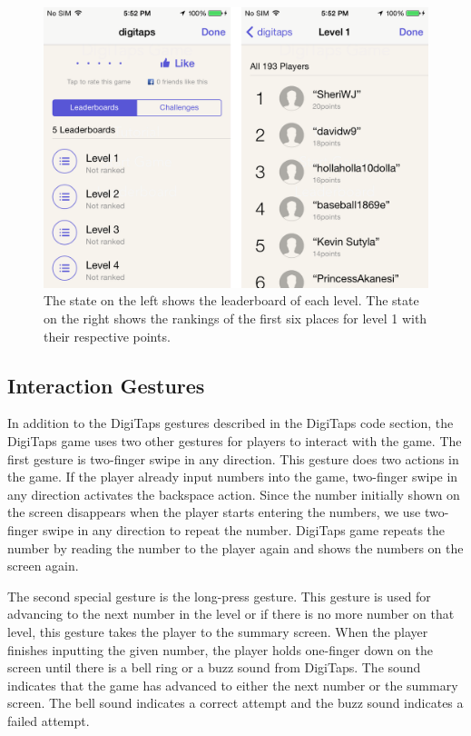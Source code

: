 \begin{figure}[h!]
  \centering
  \includegraphics[width=1.0\textwidth]{figures/leaderboard.png}
  \caption{The state on the left shows the leaderboard of each level. The state on the right shows the rankings of the first six places for level 1 with their respective points.}
  \label{leaderboard}
\end{figure}

\subsection{Interaction Gestures}
In addition to the DigiTaps gestures described in the DigiTaps code section, the DigiTaps game uses two other gestures for players to interact with the game. The first gesture is two-finger swipe in any direction. This gesture does two actions in the game. If the player already input numbers into the game, two-finger swipe in any direction activates the backspace action. Since the number initially shown on the screen disappears when the player starts entering the numbers, we use two-finger swipe in any direction to repeat the number. DigiTaps game repeats the number by reading the number to the player again and shows the numbers on the screen again.
\par
The second special gesture is the long-press gesture. This gesture is used for advancing to the next number in the level or if there is no more number on that level, this gesture takes the player to the summary screen. When the player finishes inputting the given number, the player holds one-finger down on the screen until there is a bell ring or a buzz sound from DigiTaps. The sound indicates that the game has advanced to either the next number or the summary screen. The bell sound indicates a correct attempt and the buzz sound indicates a failed attempt.

